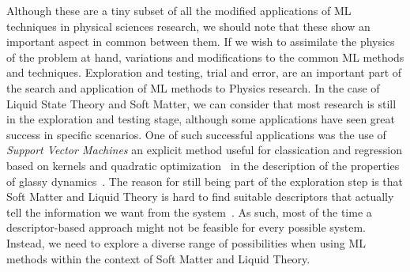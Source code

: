 Although these are a tiny subset of all the modified applications of ML techniques
in physical sciences research, we should note that these show an important aspect
in common between them. If we wish to assimilate the physics of the problem at hand,
variations and modifications to the common ML methods and techniques. Exploration and
testing, trial and error, are an important part of the search and application of
ML methods to Physics research. In the case of Liquid State Theory and Soft Matter,
we can consider that most research is still in the exploration and testing stage,
although some applications have seen great success in specific scenarios.
One of such successful applications was the use of \emph{Support Vector Machines}\textemdash
an explicit method useful for classication and regression based on kernels and
quadratic optimization~\cite{steinwartSupportVectorMachines2008}\textemdash
in the description of the properties of glassy dynamics~\cite{schoenholzStructuralApproachRelaxation2016}.
The reason for still being part of the exploration step is that Soft Matter and Liquid
Theory is hard to find suitable descriptors that actually tell the information we
want from the system~\cite{dijkstraPredictiveModellingMachine2021a}. As such, most of
the time a descriptor-based approach might not be feasible for every possible
system. Instead, we need to explore a diverse range of possibilities when using ML methods
within the context of Soft Matter and Liquid Theory.


